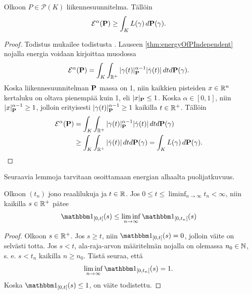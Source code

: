 \documentclass[12pt,oneside,a4paper]{amsbook} %
\begin{document}
\begin{lemma}\label{le:nrgGeThanLength}
    Olkoon $P \in \mathcal{P}(K)$ liikennesuunnitelma. Tällöin
        \begin{equation*}
            \E^\alpha(\P) \ge \int_K L(\gamma) \, d\P(\gamma).
        \end{equation*}
\end{lemma}

\begin{proof}
    Todistus mukailee todistusta \cite[s. 36]{optimal}. Lauseen \ref{thm:energyOfPIndependent} nojalla energia voidaan kirjoittaa muodossa
    \begin{equation*}
        \E^\alpha(\P) = \int_K \int_{\R^+}|\gamma(t)|^{\alpha-1}_\P|\dot\gamma(t)| \, dtd\P(\gamma).
    \end{equation*}
     Koska liikennesuunnitelman $\P$ massa on 1, niin kaikkien pisteiden $x \in \R^n$ kertaluku on oltava pienempää kuin 1, eli  $|x|_\P \le 1$. Koska $\alpha \in [0, 1]$, niin  $|x|^{\alpha-1}_\P \ge 1$, jolloin erityisesti $|\gamma(t)|^{\alpha-1}_\P \ge 1$ kaikilla $t \in \Rp$. Tällöin
    \begin{align*}
        \E^\alpha(\P) &= \int_K \int_{\R^+}|\gamma(t)|^{\alpha-1}_\P|\dot\gamma(t)| \, dtd\P(\gamma) \\ 
        &\ge \int_K \int_{\R^+}|\dot\gamma(t)| \, dtd\P(\gamma) = \int_K L(\gamma) \, d\P(\gamma).
    \end{align*}
\end{proof}

Seuraavia lemmoja tarvitaan osoittamaan energian alhaalta puolijatkuvuus.
\begin{lemma} \label{le:indFct}
    Olkoon $(t_n)$ jono reaalilukuja ja $t\in \R$.
    Jos $\displaystyle 0 \le t \le \liminf_{n\to\infty} t_n < \infty$, niin kaikilla $s \in \Rp$ pätee
         \begin{equation*}
             \indfct{[0, t[}(s) \le \liminf_{n\to\infty} \indfct{[0, t_n[}(s)
         \end{equation*}
 \end{lemma}
\begin{proof}
    Olkoon $s \in \Rp$. Jos $s \ge t$, niin $\indfct{[0, t[}(s) = 0$, jolloin väite on selvästi totta.
    Jos $s < t$, ala-raja-arvon määritelmän nojalla on olemassa $n_0 \in \N$, s. e. $s < t_n$ kaikilla $n \ge n_0$. Tästä seuraa, että
        \begin{equation*}
            \liminf_{n \to \infty} \indfct{[0, t_n[}(s) = 1.
        \end{equation*}
    Koska $\indfct{[0, t[}(s) \le 1$, on väite todistettu.
\end{proof} 
\end{document}
